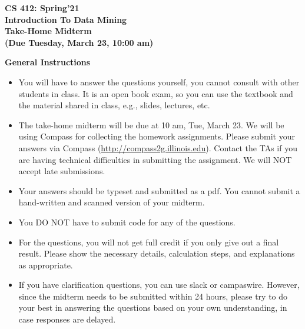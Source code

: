 \documentclass[11pt]{article}
\begin{document}
	\begin{center}
		{\bf {\huge CS 412: Spring'21}}\\
		\vspace*{2mm}
		{\bf {\huge Introduction To Data Mining}}\\
		\vspace*{5mm}
		{\bf {\huge Take-Home Midterm}\\ \vspace*{2mm} {\large (Due Tuesday, March 23, 10:00 am)}}
	\end{center}
	\par \noindent

{\bf General Instructions}
\begin{itemize}
\item You will have to answer the questions yourself, you cannot consult with other students in class. It is an open book exam, so you can use the textbook and the material shared in class, e.g., slides, lectures, etc. 

\item The take-home midterm will be due at 10 am, Tue, March 23. We will be using Compass for collecting the homework assignments. Please submit your answers via Compass (\url{http://compass2g.illinois.edu}). Contact the TAs if you are having technical difficulties in submitting the assignment. We will NOT accept late submissions.

\item Your answers should be typeset and submitted as a pdf. You cannot submit a hand-written and scanned version of your midterm.

\item You DO NOT have to submit code for any of the questions.

\item For the questions, you will not get full credit if you only give out a final result. Please show the necessary details, calculation steps, and explanations as appropriate.

\item If you have clarification questions, you can use slack or campaswire. However, since the midterm needs to be submitted within 24 hours, please try to do your best in answering the questions based on your own understanding, in case responses are delayed. 

\end{itemize}
\end{document}
